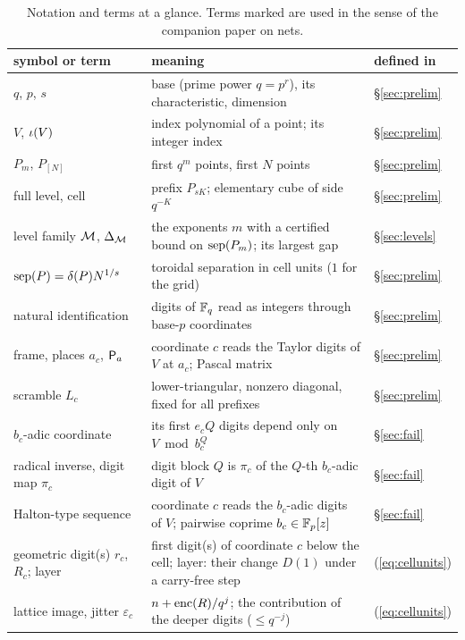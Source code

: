 %
\begin{table}[!tp]
\centering
\footnotesize
\caption{Notation and terms at a glance. Terms marked \cite{Gru26geo} are used in the sense of the companion paper on nets.}
\label{tab:glossary}
\renewcommand{\arraystretch}{0.9}\setlength{\tabcolsep}{3pt}
\begin{tabular}{@{}>{\raggedright\arraybackslash}p{}>{\raggedright\arraybackslash}p{}l@{}}
\toprule
symbol or term & meaning & defined in\\
\midrule
$q$, $p$, $s$ & base (prime power $q=p^r$), its characteristic, dimension & \S\ref{sec:prelim}\\
$V$, $\iota(V)$ & index polynomial of a point; its integer index & \S\ref{sec:prelim}\\
$P_m$, $P_{[N]}$ & first $q^m$ points, first $N$ points & \S\ref{sec:prelim}\\
full level, cell & prefix $P_{sK}$; elementary cube of side $q^{-K}$ & \S\ref{sec:prelim}\\
level family $\mathcal{M}$, $\Delta_{\mathcal{M}}$ & the exponents $m$ with a certified bound on $\operatorname{sep}(P_m)$; its largest gap & \S\ref{sec:levels}\\
$\operatorname{sep}(P)=\delta(P)N^{1/s}$ & toroidal separation in cell units ($1$ for the grid) & \S\ref{sec:prelim}\\
natural identification & digits of $\mathbb{F}_q$ read as integers through base-$p$ coordinates & \S\ref{sec:prelim}\\
frame, places $a_c$, $\mathsf{P}_a$ & coordinate $c$ reads the Taylor digits of $V$ at $a_c$; Pascal matrix & \S\ref{sec:prelim}\\
scramble $L_c$ & lower-triangular, nonzero diagonal, fixed for all prefixes & \S\ref{sec:prelim}\\
$b_c$-adic coordinate & its first $e_cQ$ digits depend only on $V\bmod b_c^Q$ & \S\ref{sec:fail}\\
radical inverse, digit map $\pi_c$ & digit block $Q$ is $\pi_c$ of the $Q$-th $b_c$-adic digit of $V$ & \S\ref{sec:fail}\\
Halton-type sequence & coordinate $c$ reads the $b_c$-adic digits of $V$; pairwise coprime $b_c\in\mathbb{F}_p[z]$ \cite{GHS26} & \S\ref{sec:fail}\\
geometric digit(s) $r_c$, $R_c$; layer & first digit(s) of coordinate $c$ below the cell; layer: their change $D(1)$ under a carry-free step & (\ref{eq:cellunits})\\
lattice image, jitter $\varepsilon_c$ & $n+\operatorname{enc}(R)/q^j$; the contribution of the deeper digits ($\le q^{-j}$) & (\ref{eq:cellunits})\\

\end{tabular}
\end{table}
